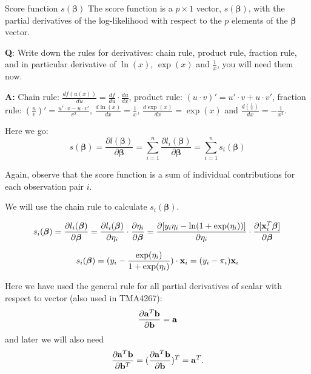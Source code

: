 \documentclass[
  ignorenonframetext,
]{beamer}
\begin{document}
\begin{frame}
\begin{block}{Score function \(s(\boldsymbol{\beta})\)}
\protect\hypertarget{score-function-sboldsymbolbeta}{}
The score function is a \(p\times 1\) vector, \(s(\boldsymbol{\beta})\),
with the partial derivatives of the log-likelihood with respect to the
\(p\) elements of the \(\boldsymbol{\beta}\) vector.

\textbf{Q}: Write down the rules for derivatives: chain rule, product
rule, fraction rule, and in particular derivative of \(\ln(x)\),
\(\exp(x)\) and \(\frac{1}{x}\), you will need them now.

\textbf{A:} Chain rule:
\(\frac{d f(u(x))}{du}=\frac{df}{du}\cdot \frac{du}{dx}\), product rule:
\((u\cdot v)'=u'\cdot v+u\cdot v'\), fraction rule:
\((\frac{u}{v})'=\frac{u' \cdot v - u\cdot v'}{v^2}\),
\(\frac{d \ln(x)}{dx}=\frac{1}{x}\), \(\frac{d\exp(x)}{dx}=\exp(x)\) and
\(\frac{d(\frac{1}{x})}{dx}=-\frac{1}{x^2}\).

Here we go:
\[s(\boldsymbol{\beta})=\frac{\partial l(\boldsymbol{\beta})}{\partial \boldsymbol{\beta}}=
\sum_{i=1}^n \frac{\partial l_i(\boldsymbol{\beta})}{\partial \boldsymbol{\beta}}=
\sum_{i=1}^n s_i(\boldsymbol{\beta})\]

Again, observe that the score function is a sum of individual
contributions for each observation pair \(i\).
\end{block}
\end{frame}

\begin{frame}
We will use the chain rule to calculate \(s_i(\boldsymbol{\beta})\).

\[s_i(\boldsymbol{\beta})=\frac{\partial l_i(\boldsymbol{\beta})}{\partial \boldsymbol{\beta}}=\frac{\partial l_i(\boldsymbol{\beta})}{\partial \eta_i}\cdot \frac{\partial \eta_i}{\partial \boldsymbol{\beta}}=\frac{\partial [y_i\eta_i-\ln(1+{\exp(\eta_i)})]}{\partial \eta_i}\cdot \frac{\partial [{\bf x}_i^T\boldsymbol{\beta} ]}{\partial \boldsymbol{\beta}}\]

\[s_i(\boldsymbol{\beta})=(y_i-\frac{\exp(\eta_i)}{1+\exp(\eta_i)})\cdot {\bf x}_i=(y_i-\pi_i) {\bf x}_i \]
\end{frame}

\begin{frame}
Here we have used the general rule for all partial derivatives of scalar
with respect to vector (also used in TMA4267):
\[\frac{\partial{\bf a}^T{\bf b}}{\partial {\bf b}}={\bf a}\] and later
we will also need
\[\frac{\partial{\bf a}^T{\bf b}}{\partial {\bf b}^T}=(\frac{\partial{\bf a}^T{\bf b}}{\partial {\bf b}})^T={\bf a}^T.\]
\end{frame}
\end{document}
